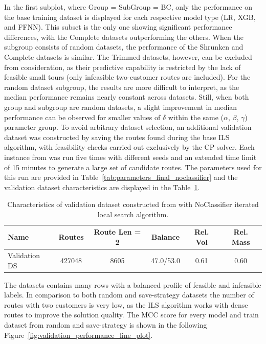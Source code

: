In the first subplot, where Group = SubGroup = BC, only the performance on the base training dataset is
displayed for each respective model type (\gls{LR}, XGB, and \gls{FFNN}). This subset is the only one showing significant
performance differences, with the Complete datasets outperforming the others. When the subgroup consists of random datasets,
the performance of the Shrunken and Complete datasets is similar. The Trimmed datasets, however, can be excluded from consideration,
as their predictive capability is restricted by the lack of feasible small tours (only infeasible two-customer routes are included).
For the random dataset subgroup, the results are more difficult to interpret, as the median performance remains nearly constant
across datasets. Still, when both group and subgroup are random datasets, a slight improvement in median performance can
be observed for smaller values of $\delta$ within the same ($\alpha$, $\beta$, $\gamma$) parameter group. To avoid arbitrary dataset
selection, an additional validation dataset was constructed by saving the routes found during the base \gls{ILS} algorithm,
with feasibility checks carried out exclusively by the \gls{CP} solver. Each instance from \gendreauDataSetText was run
five times with different seeds and an extended time limit of 15 minutes to generate a large set of candidate routes.
The parameters used for this run are provided in Table~\ref{tab:parameters_final_noclassifier} and
the validation dataset characteristics are displayed in the Table~\ref{tab:validation_dataset_gendreau}.
\begin{table}[!ht]
	\centering
	\small
	\begin{tabular}{l c c c c c }
		\toprule
		Name          & Routes & Route Len = 2 & Balance   & Rel. Vol & Rel. Mass \\
		\midrule
		Validation DS & 427048 & 8605          & 47.0/53.0 & 0.61     & 0.60      \\
		\bottomrule
	\end{tabular}
	\caption{Characteristics of validation dataset constructed from \gendreauDataSetText with NoClassifier iterated local search algorithm.}
	\label{tab:validation_dataset_gendreau}
\end{table}

The datasets contains many rows with a balanced profile of feasible and infeasible labels. In comparison to both
random and save-strategy datasets the number of routes with two customers is very low, as the \gls{ILS} algorithm
works with dense routes to improve the solution quality. The \gls{MCC} score for every model and train dataset
from random and save-strategy is shown in the following Figure~\ref{fig:validation_performance_line_plot}.

